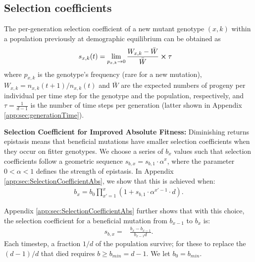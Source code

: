\documentclass[9pt,twocolumn,twoside,lineno]{gsajnl}
\begin{document}
\subsection{Selection coefficients}
The per-generation selection coefficient of a new mutant genotype $(x,k)$ within a population previously at demographic equilibrium can be obtained as  
\begin{equation}
\label{eq:SelAdvntg}
\begin{aligned}
    s_{x,k}(t) & =  \lim_{p_{x,k}\rightarrow 0} \frac{W_{x,k}-\bar{W}}{\bar{W}} \cross \tau
\end{aligned}
\end{equation}
where $p_{x,k}$ is the genotype's frequency (rare for a new mutation), $W_{x,k} = n_{x,k}(t+1)/n_{x,k}(t)$ and $\bar{W}$ are the expected numbers of progeny per individual per time step for the genotype and the population, respectively, and $\tau=\frac{1}{d - 1}$ is the number of time steps per generation (latter shown in Appendix \ref{app:sec:generationTime}). 

\textbf{Selection Coefficient for Improved Absolute Fitness:}
Diminishing returns epistasis means that beneficial mutations have smaller selection coefficients when they occur on fitter genotypes. We choose a series of $b_x$ values such that selection coefficients follow a geometric sequence $s_{b,x} = s_{b,1}\cdot\alpha^x$, where the parameter $0<\alpha<1$ defines the strength of epistasis. In Appendix \ref{app:sec:SelectionCoefficientAbs}, we show that this is achieved when:
\begin{align*}
    b_{x} = b_{0} \prod_{x'=1}^{x} (1+s_{b,1}\cdot\alpha^{x'-1}\cdot d ).
\end{align*}

Appendix \ref{app:sec:SelectionCoefficientAbs} further shows that with this choice, the selection coefficient for a beneficial mutation from $b_{x-1}$ to $b_{x}$ is: 
\begin{equation}\label{eq:selCoeffAbs}
\begin{aligned}
s_{b,x} =&  \frac{b_{x}-b_{x-1}}{b_{x-1} d}.
\end{aligned}
\end{equation}
Each timestep, a fraction $1/d$ of the population survive; for these to replace the $(d-1)/d$ that died requires $b\ge b_{min}= d-1$. We let $b_0=b_{min}$. 
\end{document}
